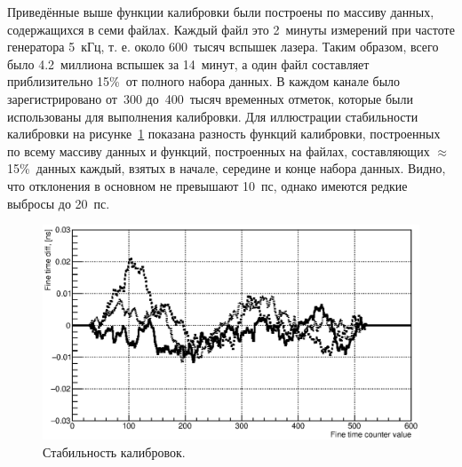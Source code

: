 Приведённые выше функции калибровки были построены по массиву данных, содержащихся в семи файлах. Каждый файл это 2~минуты измерений при частоте генератора 5~кГц, т. е. около 600~тысяч вспышек лазера. Таким образом, всего было 4.2~миллиона вспышек за  14~минут, а один файл составляет приблизительно 15\%~от полного набора данных. В каждом канале было зарегистрировано от~300 до~400~тысяч временных отметок, которые были использованы для выполнения калибровки. Для иллюстрации стабильности калибровки на рисунке~\ref{fig:Stability} показана разность функций калибровки, построенных по всему массиву данных и функций, построенных на файлах, составляющих $ \approx $15\%~данных каждый, взятых в начале, середине и конце набора данных. Видно, что отклонения в основном не превышают 10~пс, однако имеются редкие выбросы до 20~пс.

\begin{figure}
\includegraphics[width=1.0\textwidth]{pictures/calibrationStability_dec2016.eps}
\caption{Стабильность калибровок.}
\label{fig:Stability}
\end{figure}

